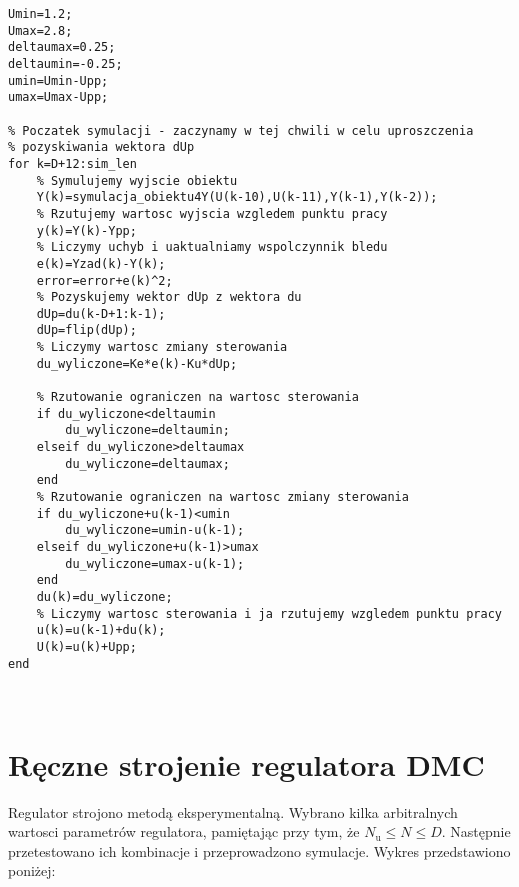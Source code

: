 \begin{lstlisting}[style=custommatlab,frame=single,label={zad4_sim_lst},caption={Implementacja regulatora DMC},captionpos=b]
% Wprowadzamy ograniczenia
Umin=1.2;
Umax=2.8;
deltaumax=0.25;
deltaumin=-0.25;
umin=Umin-Upp;
umax=Umax-Upp;

% Poczatek symulacji - zaczynamy w tej chwili w celu uproszczenia
% pozyskiwania wektora dUp
for k=D+12:sim_len
    % Symulujemy wyjscie obiektu
    Y(k)=symulacja_obiektu4Y(U(k-10),U(k-11),Y(k-1),Y(k-2));
    % Rzutujemy wartosc wyjscia wzgledem punktu pracy
    y(k)=Y(k)-Ypp;
    % Liczymy uchyb i uaktualniamy wspolczynnik bledu
    e(k)=Yzad(k)-Y(k);
    error=error+e(k)^2;
    % Pozyskujemy wektor dUp z wektora du
    dUp=du(k-D+1:k-1);
    dUp=flip(dUp);
    % Liczymy wartosc zmiany sterowania
    du_wyliczone=Ke*e(k)-Ku*dUp;

    % Rzutowanie ograniczen na wartosc sterowania
    if du_wyliczone<deltaumin
        du_wyliczone=deltaumin;
    elseif du_wyliczone>deltaumax
        du_wyliczone=deltaumax;
    end
    % Rzutowanie ograniczen na wartosc zmiany sterowania
    if du_wyliczone+u(k-1)<umin
        du_wyliczone=umin-u(k-1);
    elseif du_wyliczone+u(k-1)>umax
        du_wyliczone=umax-u(k-1);
    end
    du(k)=du_wyliczone;
    % Liczymy wartosc sterowania i ja rzutujemy wzgledem punktu pracy
    u(k)=u(k-1)+du(k);
    U(k)=u(k)+Upp;
end
    


\end{lstlisting}

\section{Ręczne strojenie regulatora DMC}

Regulator strojono metodą eksperymentalną. Wybrano kilka arbitralnych wartosci parametrów regulatora, pamiętając przy tym, że $N_{\mathrm{u}} \leq N \leq D$. Następnie przetestowano ich kombinacje i przeprowadzono symulacje. Wykres przedstawiono poniżej:



